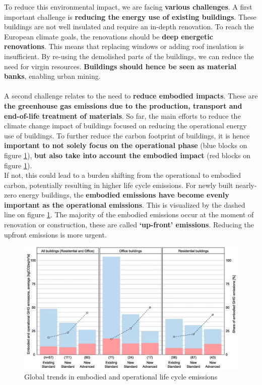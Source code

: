 \documentclass[../summary.tex]{subfiles}
\begin{document}
	To reduce this environmental impact, we are facing \textbf{various challenges}. A first important challenge is \textbf{reducing the energy use of existing buildings}. These buildings are not well insulated and require an in-depth renovation. To reach the European climate goals, the renovations should be \textbf{deep energetic renovations}. This means that replacing windows or adding roof insulation is insufficient. By re-using the demolished parts of the buildings, we can reduce the need for virgin resources. \textbf{Buildings should hence be seen as material banks}, enabling urban mining.
	\\\\
	A second challenge relates to the need to \textbf{reduce embodied impacts}. These are \textbf{the greenhouse gas emissions due to the production, transport and end-of-life treatment of materials}. So far, the main efforts to reduce the climate change impact of buildings focused on reducing the operational energy use of buildings. To further reduce the carbon footprint of buildings, it is hence \textbf{important to not solely focus on the operational phase} (blue blocks on figure \ref{fig:8-embodied-operational-trends}), \textbf{but also take into account the embodied impact} (red blocks on figure \ref{fig:8-embodied-operational-trends}). \\
	If not, this could lead to a burden shifting from the operational to embodied carbon, potentially resulting in higher life cycle emissions. For newly built nearly-zero energy buildings, the \textbf{embodied emissions have become evenly important as the operational emissions}. This is visualized by the dashed line on figure \ref{fig:8-embodied-operational-trends}. The majority of the embodied emissions occur at the moment of renovation or construction, these are called \textbf{‘up-front’ emissions}. Reducing the upfront emissions is more urgent.
	
	\begin{figure}[H]
		\centering
		\includegraphics[width=0.6\linewidth]{../images/8-embodied-operational-trends}
		\caption{Global trends in embodied and operational life cycle emissions}
		\label{fig:8-embodied-operational-trends}
	\end{figure}
	
\end{document}
